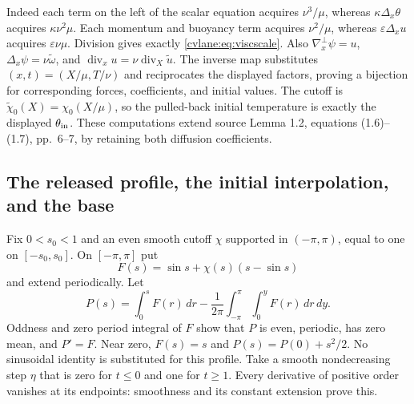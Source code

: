 Indeed each term on the left of the scalar equation acquires
$\nu^3/\mu$, whereas $\kappa\Delta_x\theta$ acquires
$\kappa\nu^2\mu$. Each momentum and buoyancy term acquires
$\nu^2/\mu$, whereas $\varepsilon\Delta_xu$ acquires
$\varepsilon\nu\mu$. Division gives exactly \eqref{cvlane:eq:viscscale}.
Also $\nabla_x^\perp\psi=u$, $\Delta_x\psi=\nu\widetilde\omega$,
and $\operatorname{div}_xu=\nu\operatorname{div}_X\widetilde u$.
The inverse map substitutes $(x,t)=(X/\mu,T/\nu)$ and reciprocates
the displayed factors, proving a bijection for corresponding forces,
coefficients, and initial values. The cutoff is
$\widetilde\chi_0(X)=\chi_0(X/\mu)$, so the pulled-back initial
temperature is exactly the displayed $\theta_{\rm in}$.
These computations extend source Lemma 1.2, equations (1.6)--(1.7),
pp.~6--7, by retaining both diffusion coefficients.

\subsection{The released profile, the initial interpolation, and the base}
Fix $0<s_0<1$ and an even smooth cutoff $\chi$ supported in
$(-\pi,\pi)$, equal to one on $[-s_0,s_0]$. On $[-\pi,\pi]$ put
\[
 F(s)=\sin s+\chi(s)(s-\sin s)
\]
and extend periodically. Let
\[
 P(s)=\int_0^sF(r)\,dr-
 \frac1{2\pi}\int_{-\pi}^{\pi}\int_0^yF(r)\,dr\,dy.
\]
Oddness and zero period integral of $F$ show that $P$ is even,
periodic, has zero mean, and $P'=F$. Near zero, $F(s)=s$ and
$P(s)=P(0)+s^2/2$. No sinusoidal identity is substituted for this profile.
Take a smooth nondecreasing step $\eta$ that is zero for $t\leq0$
and one for $t\geq1$. Every derivative of positive order vanishes
at its endpoints: smoothness and its constant extension prove this.

